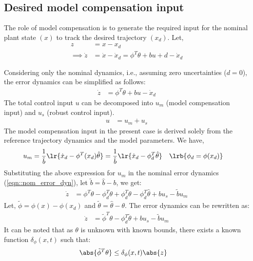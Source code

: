 \subsection{Desired model compensation input}
The role of model compensation is to generate the required input for the
nominal plant state $(x)$ to track the desired trajectory $(x_d)$.
Let,
\begin{align}
    z &= x - x_d\\
    \implies \dot z &= \dot x - \dot x_d = \phi^T \theta +  bu + d - \dot x_d
    \label{eqn::error_dyn}
\end{align}

Considering only the nominal dynamics, i.e., assuming zero uncertainties ($d = 0$), the error dynamics can be simplified as follows:
\begin{align}
    \dot z &= \phi^T \theta + bu - \dot x_d
    \label{eqn::nom_error_dyn}
\end{align}
The total control input $u$ can be decomposed into $u_m$ (model compensation input) and $u_s$ (robust control input).
\begin{align}
    u &= u_m + u_s
\end{align}
The model compensation input in the present case is derived solely from the
reference trajectory dynamics and the model parameters. We have,
\begin{align}
    u_m &= \frac{1}{\hat b} \lr{\dot x_d - \phi^T(x_d) \hat \theta}
         = \frac{1}{\hat b} \lr{\dot x_d - \phi^T_d \hat \theta}
         \quad \lrb{\phi_d  = \phi(x_d)}
    \label{eqn::model_comp_input}
\end{align}
Substituting the above expression for $u_m$ in the nominal error dynamics
(\ref{eqn::nom_error_dyn}), let $\tilde b = \hat b - b$, we get:
\begin{align}
    \dot z
    &= \phi^T \theta - \phi^T_d \theta + \phi^T_d \theta - \phi^T_d \hat \theta + bu_s - \tilde b u_m
\end{align}
Let, $\tilde \phi = \phi(x) - \phi(x_d)$ and $\tilde \theta = \hat \theta -
\theta$. The error dynamics can be rewritten as:
\begin{align}
    \dot z &= \tilde \phi^T \theta - \phi^T_d \tilde \theta + bu_s - \tilde b u_m \label{eqn::error_dyn_model_comp}
\end{align}
It can be noted that as $\theta$ is unknown with known bounds, there exists a
known function $\delta_\phi(x, t)$ such that:
\begin{align}
    \abs{\tilde \phi^T \theta} &\leq \delta_\phi(x, t) \abs{z}
    \label{eqn::tl_phi_bound}
\end{align}



